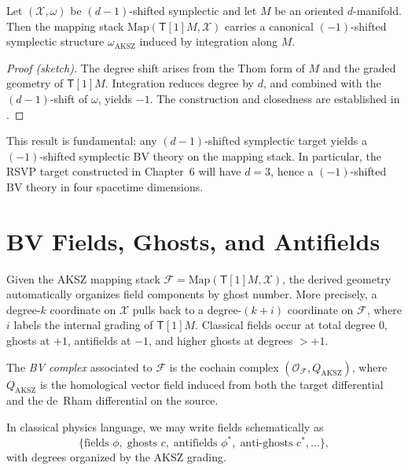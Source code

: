 \begin{theorem}[PTVV]
\label{thm:PTVV-induced}
Let $(\mathcal{X},\omega)$ be $(d-1)$-shifted symplectic
and let $M$ be an oriented $d$-manifold.
Then the mapping stack $\mathrm{Map}(\mathsf{T}[1]M,\mathcal{X})$
carries a canonical $(-1)$-shifted symplectic structure
$\omega_{\mathrm{AKSZ}}$ induced by integration along $M$.
\end{theorem}

\begin{proof}[Proof (sketch)]
The degree shift arises from the Thom form of $M$ and the graded geometry
of $\mathsf{T}[1]M$. Integration reduces degree by $d$, and combined with
the $(d-1)$-shift of $\omega$, yields $-1$. The construction and closedness
are established in \cite{PTVV13}.
\end{proof}

\begin{remark}
This result is fundamental:
any $(d-1)$-shifted symplectic target yields a $(-1)$-shifted symplectic
BV theory on the mapping stack. In particular, the RSVP target constructed
in Chapter~6 will have $d=3$, hence a $(-1)$-shifted BV theory in
four spacetime dimensions.
\end{remark}


\section{BV Fields, Ghosts, and Antifields}

Given the AKSZ mapping stack
$\mathcal{F}=\mathrm{Map}(\mathsf{T}[1]M,\mathcal{X})$,
the derived geometry automatically organizes field components by ghost
number. More precisely, a degree-$k$ coordinate on $\mathcal{X}$ pulls
back to a degree-$(k+i)$ coordinate on $\mathcal{F}$, where $i$ labels
the internal grading of $\mathsf{T}[1]M$.
Classical fields occur at total degree $0$, ghosts at $+1$, antifields at
$-1$, and higher ghosts at degrees $>+1$.

\begin{definition}
The \emph{BV complex} associated to $\mathcal{F}$ is the cochain complex
$(\mathcal{O}_{\mathcal{F}},Q_{\mathrm{AKSZ}})$, where
$Q_{\mathrm{AKSZ}}$ is the homological vector field induced from both the
target differential and the de~Rham differential on the source.
\end{definition}

\begin{remark}
In classical physics language, we may write fields schematically as
\[
\{ \text{fields } \phi,\;\text{ghosts } c,\;\text{antifields }
\phi^{\ast},\;\text{anti-ghosts } c^{\ast},\ldots \},
\]
with degrees organized by the AKSZ grading.
\end{remark}


